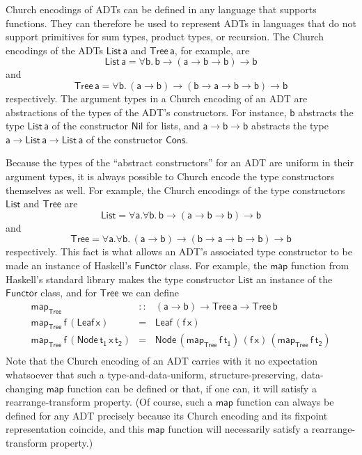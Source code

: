 \documentclass[submission,copyright,creativecommons]{eptcs}
\begin{document}
Church encodings of ADTs can be defined in any language that supports
functions. They can therefore be used to represent ADTs in languages
that do not support primitives for sum types, product types, or
recursion. The Church encodings of the ADTs $\mathsf{List\,a}$ and
$\mathsf{Tree\,a}$, for example, are
\[\mathsf{List\,a} = \mathsf{\forall b.\,b \to (a \to b \to b) \to b}\]
and 
\[\mathsf{Tree\,a} = \mathsf{\forall b.\,(a \to b) \to (b \to a \to b
  \to b) \to b}\] respectively. The argument types in a Church
encoding of an ADT are abstractions of the types of the ADT's
constructors. For instance, $\mathsf{b}$ abstracts the type
$\mathsf{List\,a}$ of the constructor $\mathsf{Nil}$ for lists, and
$\mathsf{a \to b \to b}$ abstracts the type $\mathsf{a \to List\,a \to
  List\,a}$ of the constructor $\mathsf{Cons}$.

Because the types of the ``abstract constructors'' for an ADT are
uniform in their argument types, it is always possible to Church
encode the type constructors themselves as well. For example, the
Church encodings of the type constructors $\mathsf{List}$ and
$\mathsf{Tree}$ are
\[\mathsf{List} = \mathsf{\forall a. \forall b.\,b \to (a \to b \to b)
  \to b}\] 
and 
\[\mathsf{Tree} = \mathsf{\forall a. \forall b.\,(a \to b) \to (b \to
  a \to b \to b) \to b}\] respectively. This fact is what allows an
ADT's associated type constructor to be made an instance of Haskell's
$\mathsf{Functor}$ class. For example, the $\mathsf{map}$ function
from Haskell's standard library makes the type constructor
$\mathsf{List}$ an instance of the $\mathsf{Functor}$ class, and for
$\mathsf{Tree}$ we can define
\[\begin{array}{lll}
\mathsf{map_{Tree}} & \mathsf{::} & \mathsf{(a \to b) \to Tree\,a \to Tree \,b}\\
\mathsf{map_{Tree}\, f\, (Leaf\,x)} & \mathsf{=} & \mathsf{Leaf\,(f\,x)}\\
\mathsf{map_{Tree}\, f\, (Node\,t_1\,x\,t_2)} & \mathsf{=} &
\mathsf{Node\,(map_{Tree}\, f \,t_1)\,(f\,x)\,(map_{Tree}\,f\,t_2)}\\
\end{array}\]
Note that the Church encoding of an ADT carries with it no expectation
whatsoever that such a type-and-data-uniform, structure-preserving,
data-changing $\mathsf{map}$ function can be defined or that, if one
can, it will satisfy a rearrange-transform property. (Of course, such
a $\mathsf{map}$ function can always be defined for any ADT precisely
because its Church encoding and its fixpoint representation coincide,
and this $\mathsf{map}$ function will necessarily satisfy a
rearrange-transform property.)
\end{document}

